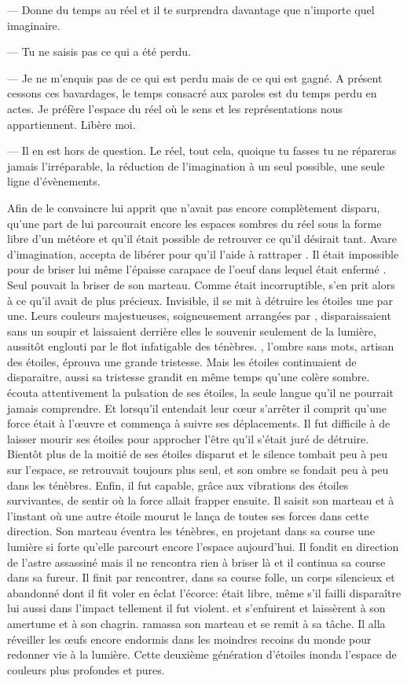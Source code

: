 --- Donne du temps au réel et il te surprendra davantage que n'importe quel imaginaire.

--- Tu ne saisis pas ce qui a été perdu. 

--- Je ne m'enquis pas de ce qui est perdu mais de ce qui est gagné. A présent cessons ces bavardages, le temps consacré aux paroles est du temps perdu en actes. Je préfère l'espace du réel où le sens et les représentations nous appartiennent. Libère moi.

--- Il en est hors de question. Le réel, tout cela, quoique tu fasses tu ne répareras jamais l'irréparable, la réduction de l'imagination à un seul possible, une seule ligne d'évènements.

Afin de le convaincre \Ogo lui apprit que \Mey n'avait pas encore complètement disparu, qu'une part de lui parcourait encore les espaces sombres du réel sous la forme libre d'un météore et qu'il était possible de retrouver ce qu'il désirait tant. Avare d'imagination, \Shuru accepta de libérer \Ogo pour qu'il l'aide à rattraper \Drisst. Il était impossible pour \Shuru de briser lui même l'épaisse carapace de l'oeuf dans lequel était enfermé \Ogo. Seul \Carac pouvait la briser de son marteau. Comme \Carac était incorruptible, \Shuru s'en prit alors à ce qu'il avait de plus précieux. Invisible, il se mit à détruire les étoiles une par une. Leurs couleurs majestueuses, soigneusement arrangées par \Carac, disparaissaient sans un soupir et laissaient derrière elles le souvenir seulement de la lumière, aussitôt englouti par le flot infatigable des ténèbres. \Carac, l'ombre sans mots, artisan des étoiles, éprouva une grande tristesse. Mais les étoiles continuaient de disparaitre, aussi sa tristesse grandit en même temps qu'une colère sombre. \Carac écouta attentivement la pulsation de ses étoiles, la seule langue qu'il ne pourrait jamais comprendre. Et lorsqu'il entendait leur cœur s'arrêter il comprit qu'une force était à l'œuvre et commença à suivre ses déplacements. Il fut difficile à \Carac de laisser mourir ses étoiles pour approcher l'être qu'il s'était juré de détruire. Bientôt plus de la moitié de ses étoiles disparut et le silence tombait peu à peu sur l'espace, \Carac se retrouvait toujours plus seul, et son ombre se fondait peu à peu dans les ténèbres. Enfin, il fut capable, grâce aux vibrations des étoiles survivantes, de sentir où la force allait frapper ensuite. Il saisit son marteau et à l'instant où une autre étoile mourut le lança de toutes ses forces dans cette direction. Son marteau éventra les ténèbres, en projetant dans sa course une lumière si forte qu'elle parcourt encore l'espace aujourd'hui. Il fondit en direction de l'astre assassiné mais il ne rencontra rien à briser là et il continua sa course dans sa fureur. Il finit par rencontrer, dans sa course folle, un corps silencieux et abandonné dont il fit voler en éclat l'écorce: \Ogo était libre, même s'il failli disparaître lui aussi dans l'impact tellement il fut violent. \Ogo et \Shuru s'enfuirent et laissèrent \Carac à son amertume et à son chagrin. \Carac ramassa son marteau et se remit à sa tâche. Il alla réveiller les œufs encore endormis dans les moindres recoins du monde pour redonner vie à la lumière. Cette deuxième génération d'étoiles inonda l'espace de couleurs plus profondes et pures. 
